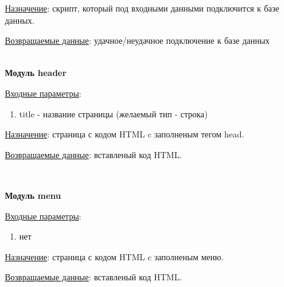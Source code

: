 \underline{Назначение}: скрипт, который под входными данными подключится к базе данных.

\underline{Возвращаемые данные}: удачное/неудачное подключение к базе данных

\hspace{0pt}\\


\textbf{Модуль header}

\underline{Входные параметры}:

\begin{enumerate}
    \item title - название страницы (желаемый тип - строка)
\end{enumerate}

\underline{Назначение}: страница с кодом HTML c заполненым тегом head.

\underline{Возвращаемые данные}: вставленый код HTML.

\hspace{0pt}\\


\newpage

\textbf{Модуль menu}

\underline{Входные параметры}:

\begin{enumerate}
    \item нет
\end{enumerate}

\underline{Назначение}: страница с кодом HTML c заполненым меню.

\underline{Возвращаемые данные}: вставленый код HTML.

\hspace{0pt}\\


\newpage